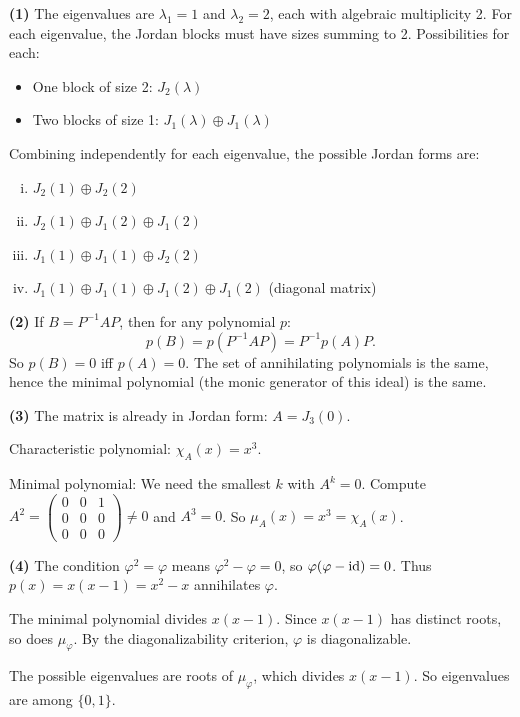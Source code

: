 \documentclass{report}
\begin{document}
\begin{solution}
\textbf{(1)} The eigenvalues are \(\lambda_1 = 1\) and \(\lambda_2 = 2\), each with algebraic multiplicity 2. For each eigenvalue, the Jordan blocks must have sizes summing to 2. Possibilities for each:
\begin{itemize}
    \item One block of size 2: \(J_2(\lambda)\)
    \item Two blocks of size 1: \(J_1(\lambda) \oplus J_1(\lambda)\)
\end{itemize}

Combining independently for each eigenvalue, the possible Jordan forms are:
\begin{enumerate}[(i)]
    \item \(J_2(1) \oplus J_2(2)\)
    \item \(J_2(1) \oplus J_1(2) \oplus J_1(2)\)
    \item \(J_1(1) \oplus J_1(1) \oplus J_2(2)\)
    \item \(J_1(1) \oplus J_1(1) \oplus J_1(2) \oplus J_1(2)\) (diagonal matrix)
\end{enumerate}

\textbf{(2)} If \(B = P^{-1}AP\), then for any polynomial \(p\):
\[p(B) = p(P^{-1}AP) = P^{-1}p(A)P.\]
So \(p(B) = 0\) iff \(p(A) = 0\). The set of annihilating polynomials is the same, hence the minimal polynomial (the monic generator of this ideal) is the same.

\textbf{(3)} The matrix is already in Jordan form: \(A = J_3(0)\). 

Characteristic polynomial: \(\chi_A(x) = x^3\).

Minimal polynomial: We need the smallest \(k\) with \(A^k = 0\). Compute \(A^2 = \begin{pmatrix} 0 & 0 & 1 \\ 0 & 0 & 0 \\ 0 & 0 & 0 \end{pmatrix} \neq 0\) and \(A^3 = 0\). So \(\mu_A(x) = x^3 = \chi_A(x)\).

\textbf{(4)} The condition \(\varphi^2 = \varphi\) means \(\varphi^2 - \varphi = 0\), so \(\varphi(\varphi - \text{id}) = 0\). Thus \(p(x) = x(x-1) = x^2 - x\) annihilates \(\varphi\).

The minimal polynomial divides \(x(x-1)\). Since \(x(x-1)\) has distinct roots, so does \(\mu_\varphi\). By the diagonalizability criterion, \(\varphi\) is diagonalizable.

The possible eigenvalues are roots of \(\mu_\varphi\), which divides \(x(x-1)\). So eigenvalues are among \(\{0, 1\}\).


\end{solution}
\end{document}

